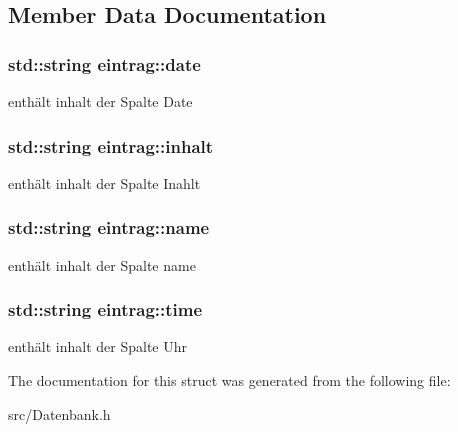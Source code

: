 \subsection{\-Member \-Data \-Documentation}
\hypertarget{structeintrag_abf2e007bb4a5b1331448539ac5aee7ee}{
\subsubsection[{date}]{\setlength{\rightskip}{0pt plus 5cm}std\-::string {\bf eintrag\-::date}}}\label{structeintrag_abf2e007bb4a5b1331448539ac5aee7ee}
enthält inhalt der \-Spalte \-Date \hypertarget{structeintrag_adc81caa378dd038281aac9b5af6048e6}{
\subsubsection[{inhalt}]{\setlength{\rightskip}{0pt plus 5cm}std\-::string {\bf eintrag\-::inhalt}}}\label{structeintrag_adc81caa378dd038281aac9b5af6048e6}
enthält inhalt der \-Spalte \-Inahlt \hypertarget{structeintrag_a61e2ae30e5fd62927ec4b197fbb911c8}{
\subsubsection[{name}]{\setlength{\rightskip}{0pt plus 5cm}std\-::string {\bf eintrag\-::name}}}\label{structeintrag_a61e2ae30e5fd62927ec4b197fbb911c8}
enthält inhalt der \-Spalte name \hypertarget{structeintrag_a62c9c521d27eaf89410d4044c1c4db16}{
\subsubsection[{time}]{\setlength{\rightskip}{0pt plus 5cm}std\-::string {\bf eintrag\-::time}}}\label{structeintrag_a62c9c521d27eaf89410d4044c1c4db16}
enthält inhalt der \-Spalte \-Uhr 

\-The documentation for this struct was generated from the following file\-:\begin{DoxyCompactItemize}
\item 
src/\-Datenbank.\-h\end{DoxyCompactItemize}
